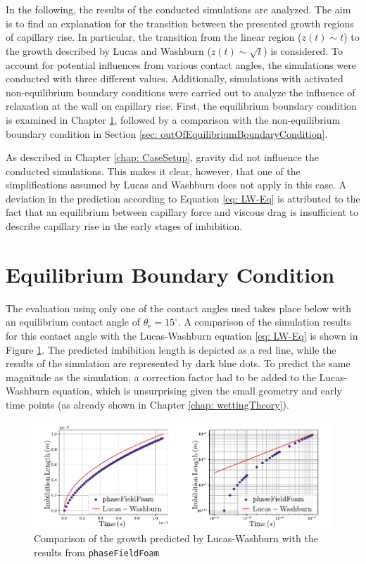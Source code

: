 In the following, the results of the conducted simulations are analyzed. The aim is to find an explanation for the transition between the presented growth regions of capillary rise. In particular, the transition from the linear region ($z(t)\sim t$) to the growth described by Lucas and Washburn ($z(t)\sim \sqrt{t}$) is considered. To account for potential influences from various contact angles, the simulations were conducted with three different values. Additionally, simulations with activated non-equilibrium boundary conditions were carried out to analyze the influence of relaxation at the wall on capillary rise.
First, the equilibrium boundary condition is examined in Chapter \ref{sec: EquilibriumBoundaryCondition}, followed by a comparison with the non-equilibrium boundary condition in Section \ref{sec: outOfEquilibriumBoundaryCondition}.

As described in Chapter \ref{chap: CaseSetup}, gravity did not influence the conducted simulations. This makes it clear, however, that one of the simplifications assumed by Lucas and Washburn does not apply in this case. A deviation in the prediction according to Equation \ref{eq: LW-Eq} is attributed to the fact that an equilibrium between capillary force and viscous drag is insufficient to describe capillary rise in the early stages of imbibition.


\section{Equilibrium Boundary Condition} 
\label{sec: EquilibriumBoundaryCondition}

The evaluation using only one of the contact angles used takes place below with an equilibrium contact angle of $\theta_{\mathrm{e}}=15^{\circ}$. A comparison of the simulation results for this contact angle with the Lucas-Washburn equation \ref{eq: LW-Eq} is shown in Figure \ref{fig: LW-PFF_comp}. The predicted imbibition length is depicted as a red line, while the results of the simulation are represented by dark blue dots. To predict the same magnitude as the simulation, a correction factor had to be added to the Lucas-Washburn equation, which is unsurprising given the small geometry and early time points (as already shown in Chapter \ref{chap: wettingTheory}).

\begin{figure}[h]
    \centering
    \includegraphics[width=.95\textwidth]{Pictures/LW-lin_loglog.pdf}
    \caption{Comparison of the growth predicted by Lucas-Washburn with the results from \texttt{phaseFieldFoam}}
    \label{fig: LW-PFF_comp}
\end{figure}

